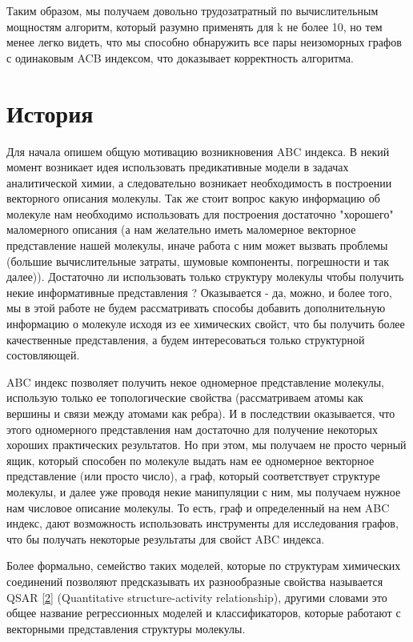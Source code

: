 \documentclass{article}
\begin{document}
Таким образом, мы получаем довольно трудозатратный по вычислительным мощностям алгоритм, который разумно применять для k не более 10, но тем менее легко видеть, что мы способно обнаружить все пары неизоморных графов с одинаковым ACB индексом, что доказывает корректность алгоритма.


\section{История}
Для начала опишем общую мотивацию возникновения ABC индекса. В некий момент возникает идея использовать предикативные модели в задачах аналитической химии, а следовательно возникает необходимость в построении векторного описания молекулы. Так же стоит вопрос какую информацию об молекуле нам необходимо использовать для построения достаточно "хорошего" маломерного описания (а нам желательно иметь маломерное векторное представление нашей молекулы, иначе работа с ним может вызвать проблемы (большие вычислительные затраты, шумовые компоненты, погрешности и так далее)). Достаточно ли использовать только структуру молекулы чтобы получить некие информативные представления ? Оказывается - да, можно, и более того, мы в этой работе не будем рассматривать способы добавить дополнительную информацию о молекуле исходя из ее химических свойст, что бы получить более качественные представления, а будем интересоваться только структурной состовляющей. 

ABC индекс позволяет получить некое одномерное представление молекулы, использую только ее топологические свойства (рассматриваем атомы как вершины и связи между атомами как ребра). И в последствии оказывается, что этого одномерного представления нам достаточно для получение некоторых хороших практических результатов. Но при этом, мы получаем не просто черный ящик, который способен по молекуле выдать нам ее одномерное векторное представление (или просто число), а граф, который соответствует структуре молекулы, и далее уже проводя некие манипуляции с ним, мы получаем нужное нам числовое описание молекулы. То есть, граф и определенный на нем ABC индекс, дают возможность использовать инструменты для исследования графов, что бы получать некоторые результаты для свойст ABC индекса.

Более формально, семейство таких моделей, которые по структурам химических соединений позволяют предсказывать их разнообразные свойства называется QSAR \hyperlink{qsar_link}{[2]} (Quantitative structure-activity relationship), другими словами это общее название регрессионных моделей и классификаторов, которые работают с векторными представления структуры молекулы.  
\end{document}
